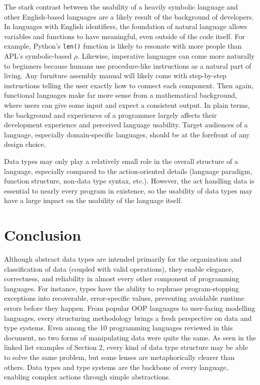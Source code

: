 \documentclass{article}
\begin{document}
The stark contrast between the usability of a heavily symbolic language and other English-based languages
are a likely result of the background of developers. In languages with English identifiers,
the foundation of natural language allows variables and functions to have meaningful, even outside of the code itself.
For example, Python's \texttt{len()} function is likely to resonate with more people than APL's symbolic-based $\rho$.
Likewise, imperative languages can come more naturally to beginners because humans use procedure-like instructions
as a natural part of living. Any furniture assembly manual will likely come with step-by-step instructions
telling the user exactly how to connect each component. Then again, functional languages make far more sense from
a mathematical background, where users can give some input and expect a consistent output.
In plain terms, the background and experiences of a programmer largely affects their development experience and perceived
language usability. Target audiences of a language, especially domain-specific languages,
should be at the forefront of any design choice.

Data types may only play a relatively small role in the overall structure of a language, especially
compared to the action-oriented details (language paradigm, function structure, non-data type syntax, etc.).
However, the act handling data is essential to nearly every program in existence,
so the usability of data types may have a large impact on the usability of the language itself.



\section{Conclusion}

Although abstract data types are intended primarily for the organization and classification of data (coupled with valid operations),
they enable elegance, correctness, and reliability in almost every other component of programming languages.
For instance, types have the ability to rephrase program-stopping exceptions into recoverable, error-specific values,
preventing avoidable runtime errors before they happen.
From popular OOP languages to user-facing modelling languages, every structuring methodology
brings a fresh perspective on data and type systems. Even among the 10 programming languages
reviewed in this document, no two forms of manipulating data were quite the same.
As seen in the linked list examples of Section 2, every kind of data type structure may be able to solve the same problem,
but some lenses are metaphorically clearer than others.
Data types and type systems are the backbone of every language,
enabling complex actions through simple abstractions.

\pagebreak
\nocite{*} %
\printbibliography %
\end{document}
